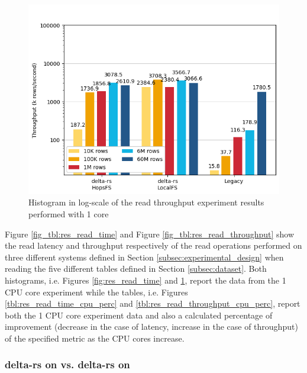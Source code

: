 \begin{figure}
\begin{minipage}[b]{\textwidth}
\begin{tabular}{c r S[table-format=4.5] S[table-format=2.2] S[table-format=2.2] S[table-format=2.2]}
            \bottomrule
        \end{tabular}
    \end{minipage}
    \begin{minipage}[b]{\textwidth}
        \includegraphics[width=\textwidth]{figures/5-results/read/read_throughput_1_core.png}
        \caption{Histogram in log-scale of the read throughput experiment results performed with 1  core}
        \label{fig:res_read_throughput}
    \end{minipage}
\end{figure}

Figure \ref{fig_tbl:res_read_time} and Figure \ref{fig_tbl:res_read_throughput} show the read latency and throughput respectively of the read operations performed on three different systems defined in Section \ref{subsec:experimental_design} when reading the five different tables defined in Section \ref{subsec:dataset}. Both histograms, i.e. Figures \ref{fig:res_read_time} and \ref{fig:res_read_throughput}, report the data from the 1 \gls{CPU} core experiment while the tables, i.e. Figures \ref{tbl:res_read_time_cpu_perc} and \ref{tbl:res_read_throughput_cpu_perc}, report both the 1 \gls{CPU} core experiment data and also a calculated percentage of improvement (decrease in the case of latency, increase in the case of throughput) of the specified metric as the \gls{CPU} cores increase.

\subsubsection*{delta-rs on  vs. delta-rs on }

